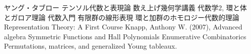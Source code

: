 \begin{thebibliography}{99}
   ヤング・タブロー
   テンソル代数と表現論
   数え上げ幾何学講義
   代数学2, 環と体とガロア理論
   代数入門
   有限群の線形表現
   環と加群のホモロジー代数的理論
   Representation Theory: A First Course
  Knapp, Anthony W. (2007), Advanced algebra
   Symmetric Functions and Hall Polynomials
   Enumerative Combinatorics
   Permutations, matrices, and generalized Young tableaux.
\end{thebibliography}